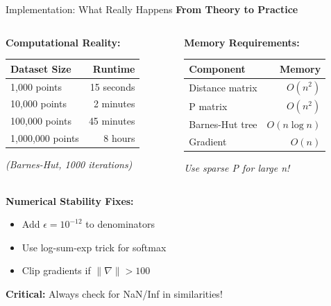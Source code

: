 \documentclass[10pt]{beamer}
\newcommand{\emphtext}[1]{\textcolor{upcblue}{\textbf{#1}}}
\newcommand{\warningbox}[1]{\colorbox{red!10}{\begin{minipage}{0.85\textwidth}\centering #1\end{minipage}}}
\begin{document}
\begin{frame}{Implementation: What Really Happens}
\emphtext{From Theory to Practice}

\vspace{0.3cm}
\begin{columns}[T]
\begin{column}{0.48\textwidth}
\textbf{Computational Reality:}
\footnotesize
\begin{tabular}{lr}
\toprule
Dataset Size & Runtime \\
\midrule
1,000 points & 15 seconds \\
10,000 points & 2 minutes \\
100,000 points & 45 minutes \\
1,000,000 points & 8 hours \\
\bottomrule
\end{tabular}

\vspace{0.2cm}
\textit{(Barnes-Hut, 1000 iterations)}
\end{column}

\begin{column}{0.48\textwidth}
\textbf{Memory Requirements:}
\footnotesize
\begin{tabular}{lr}
\toprule
Component & Memory \\
\midrule
Distance matrix & $O(n^2)$ \\
P matrix & $O(n^2)$ \\
Barnes-Hut tree & $O(n\log n)$ \\
Gradient & $O(n)$ \\
\bottomrule
\end{tabular}

\vspace{0.2cm}
\textit{Use sparse P for large n!}
\end{column}
\end{columns}

\vspace{0.3cm}
\textbf{Numerical Stability Fixes:}
\begin{itemize}
\footnotesize
\item Add $\epsilon = 10^{-12}$ to denominators
\item Use log-sum-exp trick for softmax
\item Clip gradients if $\|\nabla\| > 100$
\end{itemize}

\begin{center}
\warningbox{\footnotesize\textbf{Critical:} Always check for NaN/Inf in similarities!}
\end{center}
\end{frame}
\end{document}
